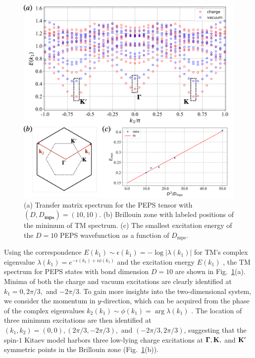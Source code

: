 \documentclass{ntuthesis}
\newcommand{\citep}{\cite}
\begin{document}
\begin{figure}[h]
 \centering
\includegraphics[width=\linewidth]{D10spect_BZ_extrapolate}
\caption{(a) Transfer matrix spectrum for the PEPS tensor with $(D,D_\textbf{mps}) = (10, 10)$. (b) Brillouin zone with labeled positions of the minimum of TM spectrum. (c) The smallest excitation energy of the $D = 10$ PEPS wavefunction as a function of $D_\text{mps}$.} 
\label{fig:D10spect_BZ_extrapolate}
\end{figure}

Using the correspondence $E(k_1) \sim \epsilon(k_1) = -\log{|\lambda(k_1)|}$ for TM's complex eigenvalue $\lambda(k_1) = e^{-\epsilon(k_1) +i\phi(k_1)}$ and the excitation energy $E(k_1)$ \citep{2015_Zauner}, the TM spectrum for PEPS states with bond dimension $D=10$ are shown in Fig.~\ref{fig:D10spect_BZ_extrapolate}(a).
%
Minima of both the charge and vacuum excitations are clearly identified at $k_1 = 0, 2\pi/3,$ and $-2\pi/3$.
%
To gain more insights into the two-dimensional system, we consider the momentum in $y$-direction, which can be acquired from the phase of the complex eigenvalues $k_2(k_1) \sim \phi(k_1) = \arg \lambda(k_1)$  \citep{2015_Zauner}. 
%
The location of three minimum excitations are then identified at $(k_1,k_2) = (0,0), (2\pi/3, -2\pi/3),$ and $(-2\pi/3, 2\pi/3)$, suggesting that the spin-$1$ Kitaev model harbors three low-lying charge excitations at  $\boldsymbol{\Gamma}, \bold{K},$ and $\bold{K'}$ symmetric points in the Brillouin zone (Fig.~\ref{fig:D10spect_BZ_extrapolate}(b)).
%
\end{document}
